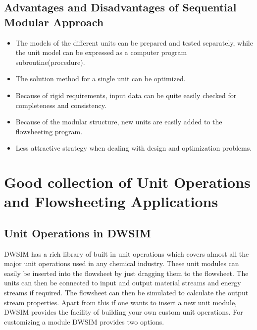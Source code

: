 \documentclass[12pt]{report}
\begin{document}
\subsection{Advantages and Disadvantages of Sequential Modular Approach}

\begin{itemize}
\item {The models of the different units can be prepared and tested separately, while the unit model can be expressed as a computer program subroutine(procedure).}
\item{The solution method for a single unit can be optimized.}
\item{Because of rigid requirements, input data can be quite easily checked for completeness and consistency.}
\item{Because of the modular structure, new units are easily added to the flowsheeting program.}
\item{Less attractive strategy when dealing with design and optimization problems.}
\end{itemize}

\section{Good collection of Unit Operations and Flowsheeting Applications}

\subsection{Unit Operations in DWSIM}

DWSIM has a rich library of built in unit operations which covers almost all the major unit operations used in any chemical industry. These unit modules can easily be inserted into the flowsheet by just dragging them to the flowsheet. The units can then be connected to input and output material streams and energy streams if required. The flowsheet can then be simulated to calculate the output stream properties.
Apart from this if one wants to insert a new unit module, DWSIM provides the facility of building your own custom unit operations. For customizing a module DWSIM provides two options.
\end{document}
